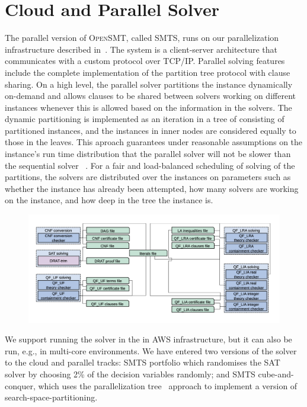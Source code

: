 \documentclass{easychair}
\newcommand{\opensmt}{\textsc{OpenSMT}\xspace}
\begin{document}
\section{Cloud and Parallel Solver}
The parallel version of \opensmt, called SMTS, runs on our parallelization infrastructure described in~\cite{MarescottiHS18}. The system is a client-server architecture that communicates with a custom protocol over TCP/IP. Parallel solving features include the complete implementation of the partition tree protocol with clause sharing. On a high level, the parallel solver partitions the instance dynamically on-demand and allows clauses to be shared between solvers working on different instances whenever this is allowed based on the information in the solvers. The dynamic partitioning is implemented as an iteration in a tree of consisting of partitioned instances, and the instances in inner nodes are considered equally to those in the leaves. This aproach guarantees under reasonable assumptions on the instance’s run time distribution that the parallel solver will not be slower than the sequential solver ~\cite{HyvarinenMS:SAT15}. For a fair and load-balanced scheduling of solving of the partitions, the solvers are distributed over the instances on parameters such as whether the instance has already been attempted, how many solvers are working on the instance, and how deep in the tree the instance is.
\begin{figure}
    \centering
    \includegraphics[angle=0, width=12cm]{Architecture.png}
    \label{fig:architecture}
\end{figure}
We support running the solver in the in AWS infrastructure, but it can also be run, e.g., in multi-core environments. We have entered two versions of the solver to the cloud and parallel tracks: SMTS portfolio which randomises the SAT solver by choosing 2\% of the decision variables randomly; and SMTS cube-and-conquer, which uses the parallelization tree~\cite{HyvarinenMS:SAT15} approach to implement a version of search-space-partitioning.
\end{document}
